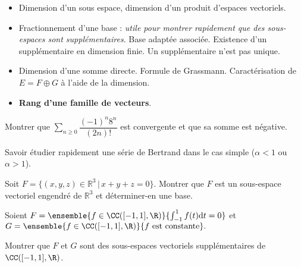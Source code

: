 \documentclass[twoside,a4paper,french,10pt]{VcCours}
\begin{document}
\begin{enumerate}
\begin{itemize}
    \item Dimension d'un sous espace, dimension d'un produit d'espaces vectoriels.
    \item Fractionnement d'une base : \textit{utile pour montrer rapidement que des sous-espaces sont supplémentaires}. Base adaptée associée. Existence d'un supplémentaire en dimension finie. Un supplémentaire n'est pas unique. 
    \item Dimension d'une somme directe. Formule de Grassmann. Caractérisation de $E= F \oplus G$ à l'aide de la dimension.
    \item \textbf{Rang d'une famille de vecteurs}.
    \end{itemize}
\end{enumerate}
\medskip

\begin{Exercice}
    Montrer que $\sum_{n \geq 0} {\dfrac{( - 1)^n 8^n}{(2n)!}}$ est convergente et que sa somme est négative.
\end{Exercice}

\begin{Exercice}
    Savoir étudier rapidement une série de Bertrand dans le \og cas simple \fg{} ($\alpha<1$ ou $\alpha>1$).
\end{Exercice}                        

\begin{Exercice}
    Soit $F = \lbrace (x,y,z) \in \mathbb{R}^3 \,  \vert \, x+y+z= 0 \rbrace.$ Montrer que $F$ est un sous-espace vectoriel engendré de $\mathbb{R}^3$ et déterminer-en une base.
\end{Exercice} 

\begin{Exercice}
    Soient $F = \ensemble{f \in \CC([-1,1],\R)}{\int_{-1}^{1} f(t)\text{d}t = 0}$
    et $G = \ensemble{f\in\CC([-1,1],\R)}{f\text{ est constante}}.$

    Montrer que $F$ et $G$ sont des sous-espaces vectoriels supplémentaires de 
    $\CC([-1,1], \R)$.
\end{Exercice} 
\end{document}
